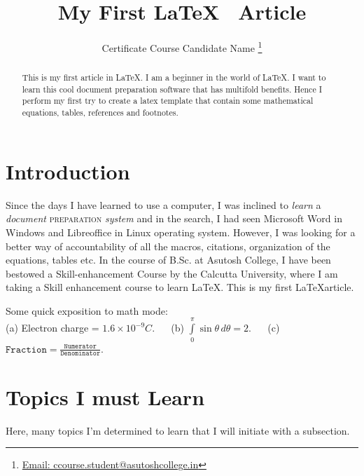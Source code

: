 \documentclass[onecolumn,12pt]{article}
\title{\bf My First \LaTeX~ Article}
\author{Certificate Course Candidate Name \thanks{\href{mailto:ccourse.student@gmail.com}{Email: ccourse.student@asutoshcollege.in}}}
\affil{Department of Physics, Asutosh College, Kolkata 700026, India}
\begin{document}
\maketitle

\begin{abstract}
This is my first article in \LaTeX. I am a beginner in the world of \LaTeX.
I want to learn this cool document preparation software that has multifold benefits. Hence I perform my first try to create a latex template that contain some mathematical equations, tables, references and footnotes.  
\end{abstract}

\section{Introduction}
\label{intro}
Since the days I have learned to use a computer, I was \textup{inclined} to \textit{learn} a \textsl{document} \textsc{preparation} \emph{system} and in the search, I had seen Microsoft Word in Windows and Libreoffice in Linux operating system. However, I was looking for a better way of accountability of all the macros, citations, organization of the equations, tables etc. In the course of B.Sc. at Asutosh College, I have been bestowed a Skill-enhancement Course by the Calcutta University, where I am taking a Skill enhancement course to learn \LaTeX\cite{leslam}. This is my first \LaTeX article. \\ 
\noindent


Some quick exposition to math mode: \\
(a) Electron charge = $1.6 \times 10^{-9} C$. ~~ 
(b) $\displaystyle{\int\limits_0 ^ \pi \sin \theta\, d\theta} = 2$. ~~ 
(c) $\texttt{Fraction} = \frac{\texttt{Numerator}}{\texttt{Denominator}}$.


\section{Topics I must Learn}
\label{sec:1}
Here, many topics I'm determined to learn that I will initiate with a subsection.
\end{document}

